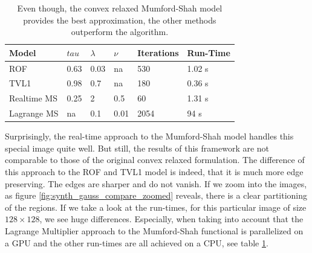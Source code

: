 \documentclass{scrreprt}
\begin{document}
            \begin{table}[!ht]
                \parbox{.9\linewidth}{
                \centering
                    \begin{tabular}{| l | l | l | l | l | l |}
                        \hline
                        Model & $tau$ & $\lambda$ & $\nu$ & Iterations & Run-Time \\ \hline\hline
                        ROF & 0.63 & 0.03 & na & 530 & 1.02 s \\ \hline
                        TVL1 & 0.98 & 0.7 & na & 180 & 0.36 s \\ \hline
                        Realtime MS & 0.25 & 2 & 0.5 & 60 & 1.31 s \\ \hline
                        Lagrange MS & na & 0.1 & 0.01 & 2054 & 94 s \\ \hline
                    \end{tabular}
                }
                \caption[Comparison for Gaussian noise removing: ROF, TVL1 and Mumford-Shah.]{Even though, the convex relaxed Mumford-Shah model provides the best approximation, the other methods outperform the algorithm.}
                \label{tab:compare_denoising_case}
            \end{table}

            Surprisingly, the real-time approach to the Mumford-Shah model handles this special image quite well. But still, the results of this framework are not comparable to those of the original convex relaxed formulation. The difference of this approach to the ROF and TVL1 model is indeed, that it is much more edge preserving. The edges are sharper and do not vanish. If we zoom into the images, as figure \ref{fig:synth_gauss_compare_zoomed} reveals, there is a clear partitioning of the regions. If we take a look at the run-times, for this particular image of size $128 \times 128$, we see huge differences. Especially, when taking into account that the Lagrange Multiplier approach to the Mumford-Shah functional is parallelized on a GPU and the other run-times are all achieved on a CPU, see table \ref{tab:compare_denoising_case}.
\end{document}
